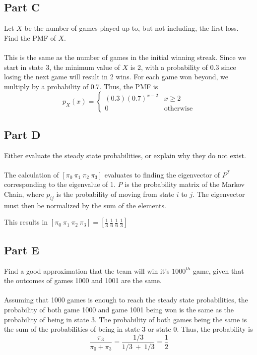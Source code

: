 \documentclass{amsart}
\begin{document}
	\subsection{Part C}
	Let $X$ be the number of games played up to, but not including, the first loss. Find the PMF of $X$.\\
	\\
	This is the same as the number of games in the initial winning streak. Since we start in state 3, the minimum value of $X$ is 2, with a probability of 0.3 since losing the next game will result in 2 wins. For each game won beyond, we multiply by a probability of 0.7. Thus, the PMF is
	\[
	p_X(x) =
	\begin{cases}
		(0.3)(0.7)^{x-2} & x \geq 2\\
		0 & \text{otherwise}
	\end{cases}
	\]
	\subsection{Part D}
	Either evaluate the steady state probabilities, or explain why they do not exist.\\
	\\
	The calculation of $[\pi_0~\pi_1 ~\pi_2~\pi_3]$ evaluates to finding the eigenvector of $P^T$ corresponding to the eigenvalue of 1. $P$ is the probability matrix of the Markov Chain, where $p_{ij}$ is the probability of moving from state $i$ to $j$. The eigenvector must then be normalized by the sum of the elements.
	
	This results in $[\pi_0~\pi_1 ~\pi_2~\pi_3] = [\frac{1}{3}~\frac{1}{6}~\frac{1}{6}~\frac{1}{3}]$
	\\
	\subsection{Part E}
	Find a good approximation that the team will win it's $1000^{th}$ game, given that the outcomes of games 1000 and 1001 are the same.\\
	\\
	Assuming that 1000 games is enough to reach the steady state probabilities, the probability of both game 1000 and game 1001 being won is the same as the probability of being in state 3. The probability of both games being the same is the sum of the probabilities of being in state 3 or state 0. Thus, the probability is
	\[
	\frac{\pi_3}{\pi_0 + \pi_3} = \frac{1/3}{1/3~+~1/3} = \frac{1}{2}
	\]
\end{document}
